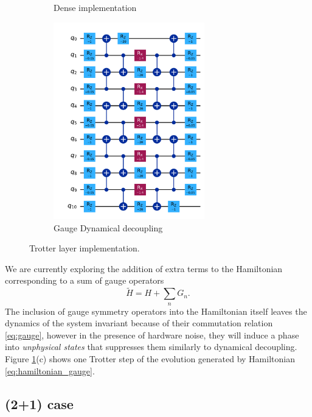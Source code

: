 \documentclass[a4paper]{article}
\begin{document}
\begin{figure}
\begin{subfigure}[bl]{0.3\textwidth}
        \caption{Dense implementation}
    \end{subfigure}
    \begin{subfigure}[position]{0.3\textwidth}
        \centering
        \includegraphics[width=0.72\textwidth]{second_order_trotter_gauge.pdf}
        \caption{Gauge Dynamical decoupling}
    \end{subfigure}
    \caption{Trotter layer implementation.}
    \label{fig:circs}
\end{figure}

We are currently exploring the addition of extra terms to the Hamiltonian corresponding to a sum of gauge operators
%
\begin{equation}
    \tilde{H} = H + \sum_n G_n.
    \label{eq:hamiltonian_gauge}
\end{equation}
%
The inclusion of gauge symmetry operators into the Hamiltonian itself leaves the dynamics of the system invariant because of their commutation relation \eqref{eq:gauge}, however in the presence of hardware noise, they will induce a phase into \textit{unphysical states} that suppresses them similarly to dynamical decoupling. Figure \ref{fig:circs}(c) shows one Trotter step of the evolution generated by Hamiltonian \eqref{eq:hamiltonian_gauge}.

\subsection{(2+1) case}
\end{document}
